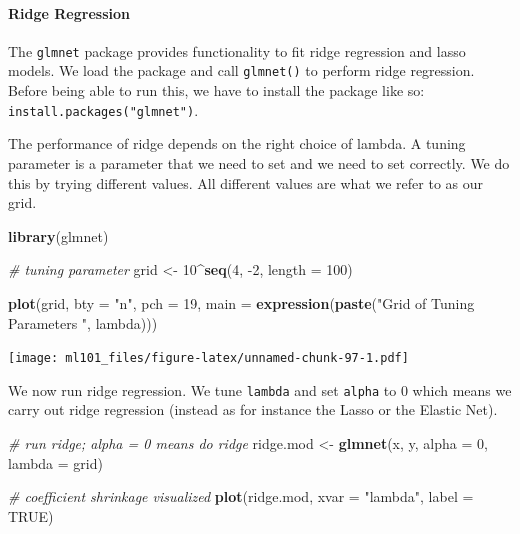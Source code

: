 \documentclass[]{article}
\newenvironment{Shaded}{\begin{snugshade}}{\end{snugshade}}
\newcommand{\CommentTok}[1]{\textcolor[rgb]{0.56,0.35,0.01}{\textit{#1}}}
\newcommand{\DataTypeTok}[1]{\textcolor[rgb]{0.13,0.29,0.53}{#1}}
\newcommand{\DecValTok}[1]{\textcolor[rgb]{0.00,0.00,0.81}{#1}}
\newcommand{\KeywordTok}[1]{\textcolor[rgb]{0.13,0.29,0.53}{\textbf{#1}}}
\newcommand{\NormalTok}[1]{#1}
\newcommand{\OperatorTok}[1]{\textcolor[rgb]{0.81,0.36,0.00}{\textbf{#1}}}
\newcommand{\OtherTok}[1]{\textcolor[rgb]{0.56,0.35,0.01}{#1}}
\newcommand{\StringTok}[1]{\textcolor[rgb]{0.31,0.60,0.02}{#1}}
\let\oldparagraph\paragraph
\renewcommand{\paragraph}[1]{\oldparagraph{#1}\mbox{}}
\begin{document}
\begin{Shaded}
\end{Shaded}

\hypertarget{ridge-regression}{%
\paragraph{Ridge Regression}\label{ridge-regression}}

The \texttt{glmnet} package provides functionality to fit ridge regression and lasso models. We load the package and call \texttt{glmnet()} to perform ridge regression. Before being able to run this, we have to install the package like so: \texttt{install.packages("glmnet")}.

The performance of ridge depends on the right choice of lambda. A tuning parameter is a parameter that we need to set and we need to set correctly. We do this by trying different values. All different values are what we refer to as our grid.

\begin{Shaded}
\begin{Highlighting}[]
\KeywordTok{library}\NormalTok{(glmnet)}

\CommentTok{# tuning parameter}
\NormalTok{grid <-}\StringTok{ }\DecValTok{10}\OperatorTok{^}\KeywordTok{seq}\NormalTok{(}\DecValTok{4}\NormalTok{, }\DecValTok{-2}\NormalTok{, }\DataTypeTok{length =} \DecValTok{100}\NormalTok{)}

\KeywordTok{plot}\NormalTok{(grid, }\DataTypeTok{bty =} \StringTok{"n"}\NormalTok{, }\DataTypeTok{pch =} \DecValTok{19}\NormalTok{,}
     \DataTypeTok{main =} \KeywordTok{expression}\NormalTok{(}\KeywordTok{paste}\NormalTok{(}\StringTok{"Grid of Tuning Parameters "}\NormalTok{, lambda)))}
\end{Highlighting}
\end{Shaded}

\texttt{[image: ml101\_files/figure-latex/unnamed-chunk-97-1.pdf]}

We now run ridge regression. We tune \texttt{lambda} and set \texttt{alpha} to 0 which means we carry out ridge regression (instead as for instance the Lasso or the Elastic Net).

\begin{Shaded}
\begin{Highlighting}[]
\CommentTok{# run ridge; alpha = 0 means do ridge}
\NormalTok{ridge.mod <-}\StringTok{ }\KeywordTok{glmnet}\NormalTok{(x, y, }\DataTypeTok{alpha =} \DecValTok{0}\NormalTok{, }\DataTypeTok{lambda =}\NormalTok{ grid)}

\CommentTok{# coefficient shrinkage visualized}
\KeywordTok{plot}\NormalTok{(ridge.mod, }\DataTypeTok{xvar =} \StringTok{"lambda"}\NormalTok{, }\DataTypeTok{label =} \OtherTok{TRUE}\NormalTok{)}
\end{Highlighting}
\end{Shaded}
\end{document}

